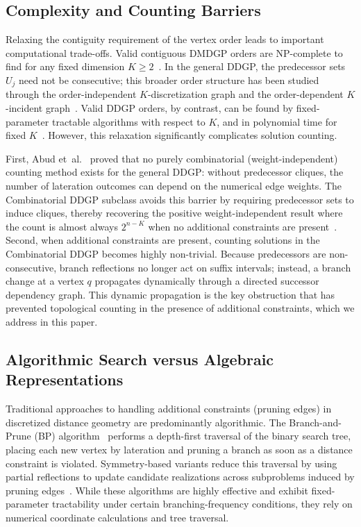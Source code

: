 \subsection{Complexity and Counting Barriers}
Relaxing the contiguity requirement of the vertex order leads to important computational trade-offs. Valid contiguous DMDGP orders are NP-complete to find for any fixed dimension $K \ge 2$~\cite{cassioli2015discretization}. In the general DDGP, the predecessor sets $U_j$ need not be consecutive; this broader order structure has been studied through the order-independent $K$-discretization graph and the order-dependent $K$-incident graph~\cite{abud2018k}. Valid DDGP orders, by contrast, can be found by fixed-parameter tractable algorithms with respect to $K$, and in polynomial time for fixed $K$~\cite{cassioli2015discretization}. However, this relaxation significantly complicates solution counting. 

First, Abud et~al.~\cite{abud2024impossible} proved that no purely combinatorial (weight-independent) counting method exists for the general DDGP: without predecessor cliques, the number of lateration outcomes can depend on the numerical edge weights. The Combinatorial DDGP subclass avoids this barrier by requiring predecessor sets to induce cliques, thereby recovering the positive weight-independent result where the count is almost always $2^{n-K}$ when no additional constraints are present~\cite{abud2024impossible}. Second, when additional constraints are present, counting solutions in the Combinatorial DDGP becomes highly non-trivial. Because predecessors are non-consecutive, branch reflections no longer act on suffix intervals; instead, a branch change at a vertex $q$ propagates dynamically through a directed successor dependency graph. This dynamic propagation is the key obstruction that has prevented topological counting in the presence of additional constraints, which we address in this paper.

\subsection{Algorithmic Search versus Algebraic Representations}
Traditional approaches to handling additional constraints (pruning edges) in discretized distance geometry are predominantly algorithmic. The Branch-and-Prune (BP) algorithm~\cite{liberti2008branch,mucherino2012discretizable} performs a depth-first traversal of the binary search tree, placing each new vertex by lateration and pruning a branch as soon as a distance constraint is violated. Symmetry-based variants reduce this traversal by using partial reflections to update candidate realizations across subproblems induced by pruning edges~\cite{goncalves2021new}. While these algorithms are highly effective and exhibit fixed-parameter tractability under certain branching-frequency conditions, they rely on numerical coordinate calculations and tree traversal. 

